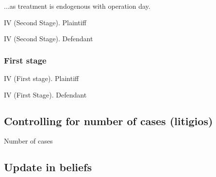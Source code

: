 \documentclass[12pt]{article}
\theoremstyle{named}
\newcommand{\folder}{./Effect}
\begin{document}
...as treatment is endogenous with operation day.


\begin{table}[H]\centering \caption{IV (Second Stage). Plaintiff}
\begin{center}
\scriptsize{}
\end{center}
\end{table}
\begin{table}[H]\centering \caption{IV (Second Stage). Defendant}
\begin{center}
\scriptsize{}
\end{center}
\end{table}


\subsubsection*{First stage}


\begin{table}[H]\centering \caption{IV (First stage). Plaintiff}
\begin{center}
\scriptsize{}
\end{center}
\end{table}
\begin{table}[H]\centering \caption{IV (First Stage). Defendant}
\begin{center}
\scriptsize{}
\end{center}
\end{table}


\subsection*{Controlling for number of cases (litigios) }



\begin{table}[H]\centering \caption{Number of cases}
\begin{center}
\scriptsize{}
\end{center}
\end{table}


\pagebreak


\subsection*{Update in beliefs}
\end{document}
